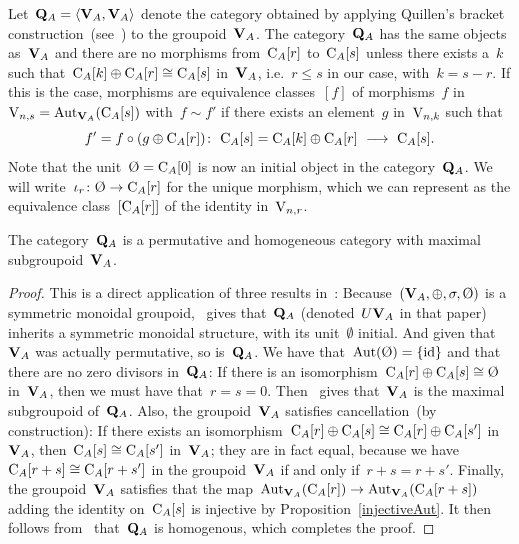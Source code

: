 Let~\hbox{$\mathbf{Q}_A=\langle\mathbf{V}_A,\mathbf{V}_A\rangle$} denote the category obtained by applying Quillen's bracket construction~(see~\cite[p.~219]{Grayson:QuillenII}) to the groupoid~$\mathbf{V}_A$.  The category~$\mathbf{Q}_A$ has the same objects as~$\mathbf{V}_A$ and there are no morphisms from~$\mathrm{C}_A[r]$ to~$\mathrm{C}_A[s]$ unless there exists a~$k$ such that~\hbox{$\mathrm{C}_A[k]\oplus\mathrm{C}_A[r]\cong\mathrm{C}_A[s]$} in~$\mathbf{V}_A$, i.e.~$r\leqslant s$ in our case, with~\hbox{$k=s-r$}. If this is the case, morphisms are equivalence classes~$[f]$ of morphisms~$f$ in~$\mathrm{V}_{n,s}=\operatorname{Aut}_{\mathbf{V}_A}(\mathrm{C}_A[s])$ with~$f\sim f'$ if there exists an element~$g$ in~$\mathrm{V}_{n,k}$ such 
that
\[
f'=f\circ (g\oplus\rmC_A[r])\colon\ \rmC_A[s]=\rmC_A[k]\oplus\rmC_A[r]\ \rar\ \rmC_A[s].
\] 
Note that the unit~$\emptyset=\rmC_A[0]$ is now an initial object in the category~$\mathbf{Q}_A$. We will write~\hbox{$\iota_{r}\colon\emptyset\to\rmC_A[r]$} for the unique morphism, which we can represent as the equivalence class~$[\mathrm{C}_A[r]]$ of the identity in~$\mathrm{V}_{n,r}$. 


\begin{proposition}
The category~$\mathbf{Q}_A$ is a permutative and homogeneous category with maximal subgroupoid~$\mathbf{V}_A$.   
\end{proposition}

\begin{proof} This is a direct application of three results in~\cite{Randal-Williams+Wahl}: Because~$(\bfV_A,\oplus,\s,\emptyset)$ is a symmetric monoidal groupoid,~\cite[Prop.~1.7]{Randal-Williams+Wahl} gives that~$\mathbf{Q}_A$ (denoted~$U\mathbf{V}_A$ in that paper) inherits a symmetric monoidal structure, with its unit~$\emptyset$ initial. And given that~$\mathbf{V}_A$ was actually permutative, so is~$\mathbf{Q}_A$. 
We have that~$\Aut(\emptyset)=\{\id\}$ and that there are no zero divisors in~$\mathbf{Q}_A$: If there is an isomorphism~$\rmC_A[r]\oplus\rmC_A[s]\cong\emptyset$ in~$\mathbf{V}_A$, then we must have that~$r=s=0$. Then~\cite[Prop.~1.6]{Randal-Williams+Wahl} gives that~$\mathbf{V}_A$ is the maximal subgroupoid of~$\mathbf{Q}_A$. Also, the groupoid~$\mathbf{V}_A$ satisfies cancellation~(by construction): If there exists an isomorphism~$\mathrm{C}_A[r]\oplus\mathrm{C}_A[s]\cong\mathrm{C}_A[r]\oplus\mathrm{C}_A[s']$ in~$\mathbf{V}_A$, then~\hbox{$\mathrm{C}_A[s]\cong\mathrm{C}_A[s']$} in~$\mathbf{V}_A$; they are in fact equal, because we have~\hbox{$\mathrm{C}_A[r+s]\cong\mathrm{C}_A[r+s']$} in the groupoid~$\mathbf{V}_A$ if and only if~$r+s=r+s'$. Finally, the groupoid~$\mathbf{V}_A$ satisfies that the map~\hbox{$\operatorname{Aut}_{\mathbf{V}_A}(\mathrm{C}_A[r])\to\operatorname{Aut}_{\mathbf{V}_A}(\mathrm{C}_A[r+s])$} adding the identity on~$\mathrm{C}_A[s]$ is injective by Proposition~\ref{injectiveAut}. It then follows from~\cite[Thm.~1.9]{Randal-Williams+Wahl} that~$\mathbf{Q}_A$ is homogenous, which completes the proof. 
\end{proof}

